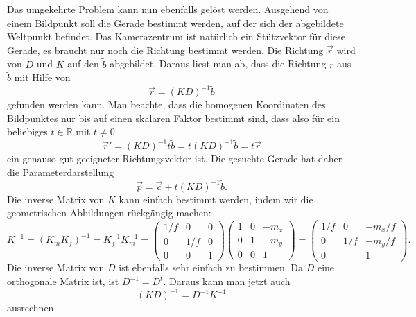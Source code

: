 Das umgekehrte Problem kann nun ebenfalls gelöst werden.
Ausgehend von einem Bildpunkt soll die Gerade bestimmt werden, auf der
sich der abgebildete Weltpunkt befindet.
Das Kamerazentrum ist natürlich ein Stützvektor für diese Gerade, es
braucht nur noch die Richtung bestimmt werden.
Die Richtung $\vec{r}$ wird von $D$ und $K$ auf den $\tilde b$ abgebildet.
Daraus liest man ab, dass die Richtung $r$ aus $\tilde b$
mit Hilfe von
\[
\vec{r} = (KD)^{-1} \tilde b
\]
gefunden werden kann.
Man beachte, dass die homogenen Koordinaten des Bildpunktes nur bis auf
einen skalaren Faktor bestimmt sind, dass also für ein beliebiges
$t\in\mathbb R$ mit $t\ne 0$ 
\[
\vec{r}' = (KD)^{-1} t\tilde b = t (KD)^{-1} \tilde b=t\vec{r}
\]
ein genauso gut geeigneter Richtungsvektor ist.
Die gesuchte Gerade hat daher die Parameterdarstellung
\[
\vec{p} = \vec{c} + t (KD)^{-1}\tilde b.
\]
Die inverse Matrix von $K$ kann einfach bestimmt werden, indem wir die
geometrischen Abbildungen rückgängig machen:
\[
K^{-1}
=
(K_mK_f)^{-1}
=
K_f^{-1}K_m^{-1}
=
\begin{pmatrix}
1/f& 0 & 0\\
0  &1/f& 0\\
0  & 0 & 1
\end{pmatrix}
\begin{pmatrix}
1&0&-m_x\\
0&1&-m_y\\
0&0&1
\end{pmatrix}
=
\begin{pmatrix}
1/f& 0 & -m_x/f\\
 0 &1/f& -m_y/f\\
 0 &   &  1
\end{pmatrix}.
\]
Die inverse Matrix von $D$ ist ebenfalls sehr einfach zu bestimmen.
Da $D$ eine orthogonale Matrix ist, ist $D^{-1}=D^t$.
Daraus kann man jetzt auch
\[
(KD)^{-1} = D^{-1}K^{-1}
\]
ausrechnen.

